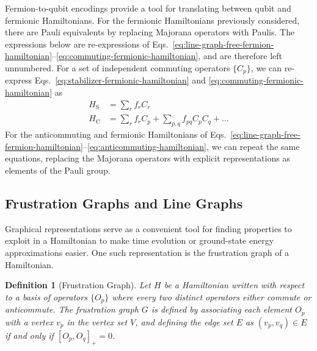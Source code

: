 \documentclass[%
 aip,
 amsmath,amssymb,
 reprint,%
]{revtex4-1}
\newtheorem{identity}{{Definition}}
\newcommand{\stabilizerHamiltonian}{H_{\mathrm{S}}}
\newcommand{\commutingHamiltonian}{H_{\mathrm{C}}}
\newcommand{\coeff}{f}
\begin{document}


Fermion-to-qubit encodings provide a tool for translating between qubit and %
fermionic Hamiltonians. For the fermionic Hamiltonians previously considered, there are Pauli %
equivalents by replacing Majorana operators with Paulis. The expressions below are re-expressions of Eqs.~\eqref{eq:line-graph-free-fermion-hamiltonian}--\eqref{eq:commuting-fermionic-hamiltonian}, and are therefore left unnumbered. For a set of %
independent commuting operators $\{C_p\}$, we can re-express Eqs.~\eqref{eq:stabilizer-fermionic-hamiltonian} and \eqref{eq:commuting-fermionic-hamiltonian} as
\begin{align*}
    \stabilizerHamiltonian &= \sum_r \coeff_r C_r \\
    \commutingHamiltonian &= \sum_r \coeff_r C_p + \sum_{p,q} \coeff_{pq} C_p C_q + ...
\end{align*}
For the anticommuting and fermionic Hamiltonians of Eqs.~\eqref{eq:line-graph-free-fermion-hamiltonian}--\eqref{eq:anticommuting-hamiltonian}, we can repeat the same equations,
replacing the Majorana operators with explicit representations as elements of the Pauli group. 

\subsection{Frustration Graphs and Line Graphs}


\indent Graphical representations serve as a convenient tool for finding properties to exploit in a Hamiltonian to make time evolution or ground-state energy approximations easier. One such representation is the frustration graph of a Hamiltonian. 

\begin{identity}[Frustration Graph]
    Let $H$ be a Hamiltonian written with respect to a basis of operators $\{ O_p\}$ where every two distinct operators either commute or anticommute. The frustration graph $G$ is defined by associating each element $O_p$ with a vertex %
    $v_p$ in the vertex set $V$, and defining the edge set
    $E$ as $(v_p,v_q)\in E$ if and only if $[O_p, O_q]_+ = 0$.
\end{identity}
\end{document}
